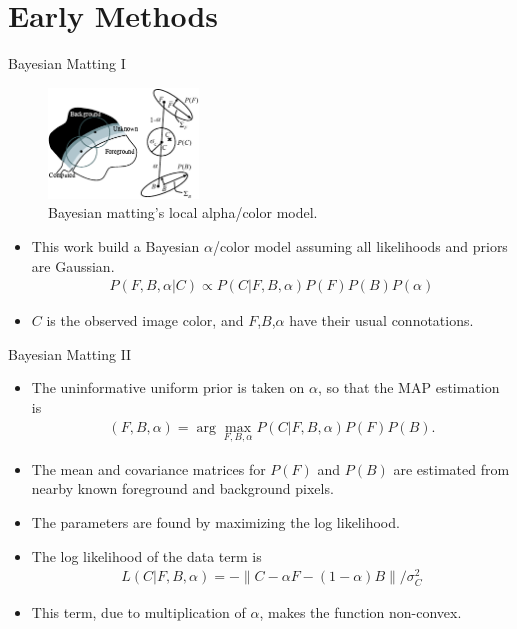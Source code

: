 \documentclass{beamer}
\providecommand{\norm}[1]{\left\lVert #1 \right\rVert}
\begin{document}
\section{Early Methods}%

\begin{frame}{Bayesian Matting \cite{chuang2001bayesian} I}
 \begin{figure}
  \includegraphics[width=4cm]{images/bayesian.png}
  \caption{Bayesian matting's local alpha/color model.}
 \end{figure}
 \begin{itemize}
  \item This work build a Bayesian $\alpha$/color model assuming all likelihoods
        and priors are Gaussian.
  \begin{align}
   P(F,B,\alpha|C) \propto P(C|F,B,\alpha)P(F)P(B)P(\alpha)
  \end{align}
  \item $C$ is the observed image color, and $F$,$B$,$\alpha$ have their usual connotations.
 \end{itemize}
\end{frame}

\begin{frame}{Bayesian Matting \cite{chuang2001bayesian} II}
 \begin{itemize}
  \item The uninformative uniform prior is taken on $\alpha$, so that the MAP estimation is
  \begin{align}
   (F,B,\alpha) = \arg \max_{F,B,\alpha} P(C|F,B,\alpha)P(F)P(B).
  \end{align}
  \item The mean and covariance matrices for $P(F)$ and $P(B)$ are estimated
        from nearby known foreground and background pixels.
  \item The parameters are found by maximizing the log likelihood.
  \item The log likelihood of the data term is
  \begin{align}
   L(C|F,B,\alpha) = -\norm{C-\alpha F - (1-\alpha)B}/\sigma_C^2
  \end{align}
  \item This term, due to multiplication of $\alpha$, makes the function non-convex.
 \end{itemize}
\end{frame}
\end{document}
